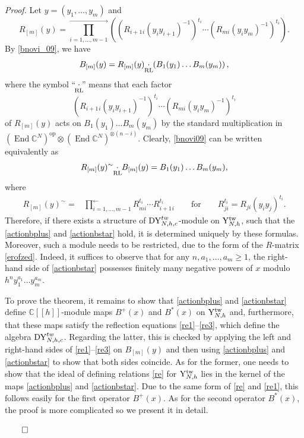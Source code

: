 \documentclass[12pt,a4paper,reqno]{amsart}
\theoremstyle{stil}
\theoremstyle{defi}
\theoremstyle{defi}
\theoremstyle{stil}
\theoremstyle{stil}
\theoremstyle{stil}
\theoremstyle{prim}
\newenvironment{prf}{\noindent \textit{Proof.}}{\null\hfill$\qed$\hskip
2mm\vskip 2mm}
\newcommand{\beq}{\begin{equation}}
\newcommand{\eeq}{\end{equation}}
\newcommand{\ot}{\otimes}
\newcommand{\ts}{\hspace{1pt}}
\newcommand{\ndo}{\mathop{\mathrm{End}}}
\newcommand{\yhg}{{\rm Y}_{N,h}^{\text{tw}} }
\newcommand{\dyho}{{\rm DY}_{N,h,c}^{tw}  }
\newcommand{\CC}{\mathbb{C}}
\newcommand{\cdotrl}{\mathop{\hspace{-2pt}\underset{\text{RL}}{\cdot}\hspace{-2pt}}}
\begin{document}
\begin{prf}
Let $y=(y_1,\ldots ,y_m)$ and
\beq\label{tmpf004}
R_{[m]} (y)=\prod_{i=1,\ldots ,m-1 }^{\longrightarrow}
\left( \left( R_{i+1\ts i}(y_i y_{i+1})^{-1}\right)^{t_i}\cdots
\left( R_{m i}(y_i y_{m})^{-1}\right)^{t_i}\right).
\eeq
By \eqref{bnovi_09}, 
we have
\beq\label{bnovi09}
 B_{[m]}(y)=R_{[m]} (y)\cdotrl \left(B_1(y_1)\ldots  B_m(y_m)\right),
\eeq
where the symbol ``$\cdotrl$'' means that each factor 
$$
  \left(R_{i+1\ts i}(y_i y_{i+1})^{-1}\right)^{t_i}\cdots
\left( R_{m i}(y_i y_{m})^{-1}\right)^{t_i}
$$
of $R_{[m]} (y)$
acts on $ B_1(y_1)\ldots  B_m(y_m) $ by  the standard multiplication in $(\ndo\CC^N)^{\text{op}}\ot(\ndo\CC^{N})^{\ot(n-i)}$.
Clearly, \eqref{bnovi09} can be written equivalently as
\beq\label{tmpf002}
 R_{[m]} (y)^\sim \cdotrl B_{[m]}(y)=  B_1(y_1)\ldots  B_m(y_m),
\eeq
where
\begin{align}
R_{[m]} (y)^\sim=&\prod_{i=1,\ldots ,m-1 }^{\longleftarrow}
 R_{m i}^{t_i}  \cdots
 R_{i+1\ts i}^{t_i}\qquad\text{for}\qquad R_{ji}^{t_i}=R_{ji}(y_i y_j)^{t_i}.\label{tmpf08}
\end{align}
Therefore,  if there exists a structure of 
$\dyho$-module on $\yhg$, such that the  \eqref{actionbplus} and \eqref{actionbstar}  hold, it is determined uniquely by these formulas.
Moreover, such a module needs to be restricted, due to the form of the $R$-matrix \eqref{erofzed}. Indeed, it suffices to observe that for any $n,a_1,\ldots ,a_m\geqslant 1$, the right-hand side of \eqref{actionbstar} possesses finitely many negative powers of $x$ modulo $h^n y_1^{a_1}\ldots y_m^{a_m}$.

To prove the theorem, it remains to show that \eqref{actionbplus} and \eqref{actionbstar} define $\CC[[h]]$-module maps $B^+(x)$ and $B^*(x)$ on $\yhg$ and, furthermore, that these maps satisfy the reflection equations \eqref{re1}--\eqref{re3}, which define the algebra $\dyho$. Regarding the latter, this is checked by applying the left and right-hand sides of \eqref{re1}--\eqref{re3} on  $B_{[m]}(y)$ and then using  \eqref{actionbplus} and \eqref{actionbstar} to show that   both sides coincide. As for the former, one needs to show that the ideal of  defining relations \eqref{re} for $\yhg$ lies in the kernel  of the maps \eqref{actionbplus} and \eqref{actionbstar}. Due to the same form of \eqref{re} and  \eqref{re1}, this follows easily for the first operator $B^+(x)$.  As for the second operator $B^*(x)$, the proof is more complicated so we present it in detail.


\end{prf}
\end{document}
